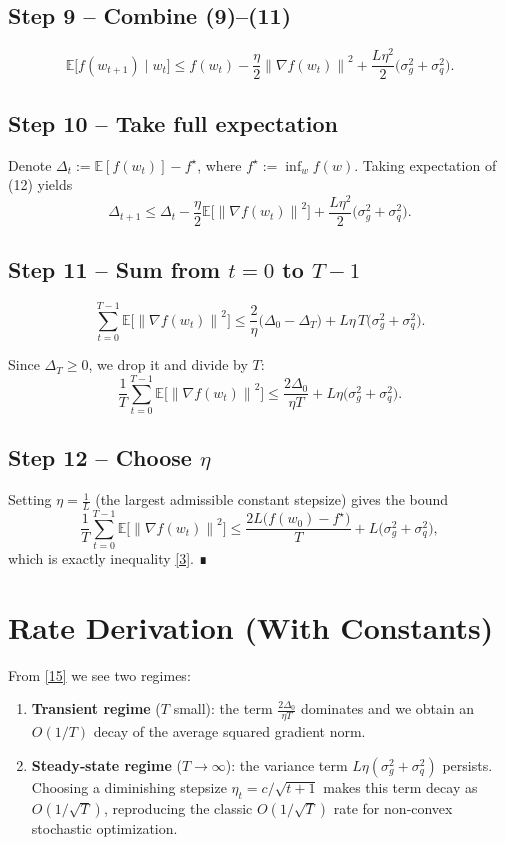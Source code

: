 \documentclass{article}
\newcommand{\E}{\mathbb{E}}
\newcommand{\norm}[1]{\left\|#1\right\|}
\begin{document}
\subsection*{Step 9 – Combine (9)–(11)}
\[
\E\!\big[f(w_{t+1})\mid w_t\big]
\le f(w_t)-\frac{\eta}{2}\norm{\nabla f(w_t)}^2
+\frac{L\eta^2}{2}\big(\sigma_g^2+\sigma_q^2\big).
\tag{12}
\]

\subsection*{Step 10 – Take full expectation}
Denote $\Delta_t:=\E[f(w_t)]-f^\star$, where $f^\star:=\inf_w f(w)$.  
Taking expectation of (12) yields
\[
\Delta_{t+1}\le\Delta_t-\frac{\eta}{2}\E\!\big[\norm{\nabla f(w_t)}^2\big]
+\frac{L\eta^2}{2}\big(\sigma_g^2+\sigma_q^2\big).
\tag{13}
\]

\subsection*{Step 11 – Sum from $t=0$ to $T-1$}
\[
\sum_{t=0}^{T-1}\E\!\big[\norm{\nabla f(w_t)}^2\big]
\le\frac{2}{\eta}\big(\Delta_0-\Delta_T\big)
+L\eta\,T\big(\sigma_g^2+\sigma_q^2\big).
\tag{14}
\]

Since $\Delta_T\ge0$, we drop it and divide by $T$:
\[
\frac{1}{T}\sum_{t=0}^{T-1}\E\!\big[\norm{\nabla f(w_t)}^2\big]
\le\frac{2\Delta_0}{\eta T}+L\eta\big(\sigma_g^2+\sigma_q^2\big).
\tag{15}
\]

\subsection*{Step 12 – Choose $\eta$}
Setting $\eta=\frac{1}{L}$ (the largest admissible constant stepsize) gives the bound
\[
\frac{1}{T}\sum_{t=0}^{T-1}\E\!\big[\norm{\nabla f(w_t)}^2\big]
\le\frac{2L\big(f(w_0)-f^\star\big)}{T}+L\big(\sigma_g^2+\sigma_q^2\big),
\]
which is exactly inequality \eqref{3}.  ∎

\section*{Rate Derivation (With Constants)}
From \eqref{15} we see two regimes:

\begin{enumerate}
\item \textbf{Transient regime} ($T$ small): the term $\frac{2\Delta_0}{\eta T}$ dominates and we obtain an $O(1/T)$ decay of the average squared gradient norm.
\item \textbf{Steady‑state regime} ($T\to\infty$): the variance term $L\eta(\sigma_g^2+\sigma_q^2)$ persists.  Choosing a diminishing stepsize $\eta_t=c/\sqrt{t+1}$ makes this term decay as $O(1/\sqrt{T})$, reproducing the classic $O(1/\sqrt{T})$ rate for non‑convex stochastic optimization.
\end{enumerate}
\end{document}
